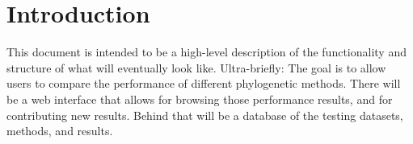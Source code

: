 \section{Introduction}

This document is intended to be a high-level description of the functionality and structure of what \phycomb will eventually look like.
Ultra-briefly:
The goal is to allow users to compare the performance of different phylogenetic methods.
There will be a web interface that allows for browsing those performance results, and for contributing new results.
Behind that will be a database of the testing datasets, methods, and results.
